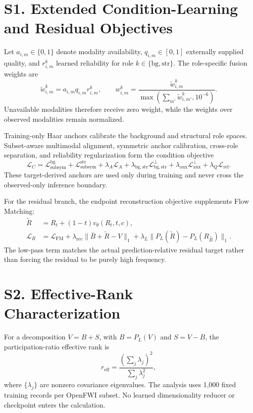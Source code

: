 \documentclass[remotesensing,supfile,submit,pdftex,moreauthors]{Definitions/mdpi}
\begin{document}
\section{S1. Extended Condition-Learning and Residual Objectives}

Let $a_{i,m}\in\{0,1\}$ denote modality availability, $q_{i,m}\in[0,1]$ externally supplied quality, and $r_{i,m}^{k}$ learned reliability for role $k\in\{\mathrm{bg},\mathrm{str}\}$. The role-specific fusion weights are
\begin{equation}
\widetilde w_{i,m}^{k}=a_{i,m}q_{i,m}r_{i,m}^{k},
\qquad
w_{i,m}^{k}=
\frac{\widetilde w_{i,m}^{k}}
{\max\left(\sum_{m'}\widetilde w_{i,m'}^{k},10^{-6}\right)}.
\end{equation}
Unavailable modalities therefore receive zero weight, while the weights over observed modalities remain normalized.

Training-only Haar anchors \citep{mallat1989theory} calibrate the background and structural role spaces. Subset-aware multimodal alignment, symmetric anchor calibration, cross-role separation, and reliability regularization form the condition objective
\begin{equation}
\mathcal L_C=
\mathcal L_{\mathrm{subsym}}^{\mathrm{bg}}
+\mathcal L_{\mathrm{subsym}}^{\mathrm{str}}
+\lambda_A\mathcal L_A
+\lambda_{\mathrm{bg,str}}\mathcal L_{\mathrm{bg,str}}^{\perp}
+\lambda_{\mathrm{aux}}\mathcal L_{\mathrm{aux}}^{\perp}
+\lambda_Q\mathcal L_{\mathrm{rel}}.
\end{equation}
These target-derived anchors are used only during training and never cross the observed-only inference boundary.

For the residual branch, the endpoint reconstruction objective supplements Flow Matching:
\begin{align}
\widetilde R
&=R_t+(1-t)v_\theta(R_t,t,c),\\
\mathcal L_R
&=\mathcal L_{\mathrm{FM}}
+\lambda_{\mathrm{rec}}\|\bar B+\widetilde R-V\|_1
+\lambda_L\|P_L(\widetilde R)-P_L(R_{\hat B})\|_1.
\end{align}
The low-pass term matches the actual prediction-relative residual target rather than forcing the residual to be purely high frequency.

\section{S2. Effective-Rank Characterization}

For a decomposition $V=B+S$, with $B=P_L(V)$ and $S=V-B$, the participation-ratio effective rank \citep{jolliffe2002pca} is
\begin{equation}
r_{\mathrm{eff}}=
\frac{\left(\sum_j\lambda_j\right)^2}{\sum_j\lambda_j^2},
\end{equation}
where $\{\lambda_j\}$ are nonzero covariance eigenvalues. The analysis uses 1,000 fixed training records per OpenFWI subset. No learned dimensionality reducer or checkpoint enters the calculation.
\end{document}
